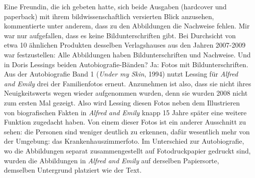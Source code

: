 \documentclass[fontsize=12pt]{scrartcl}
\begin{document}
Eine Freundin\textsuperscript{\tiny *}, die ich gebeten hatte, sich beide Ausgaben (hardcover und paperback) mit ihrem bildwissenschaftlich versierten Blick anzusehen, kommentierte unter anderem, dass zu den Abbildungen die Nachweise fehlen. Mir war nur aufgefallen, dass es keine Bildunterschriften gibt. Bei Durchsicht von etwa 10 \"ahnlichen Produkten desselben Verlagshauses aus den Jahren 2007-2009 war festzustellen: Alle Abbildungen haben Bildunterschriften und Nachweise. Und in Doris Lessings beiden Autobiografie-B\"anden? Ja: Fotos mit Bildunterschriften. Aus der Autobiografie Band 1 (\textit{Under my Skin}, 1994) nutzt Lessing f\"ur \textit{Alfred and Emily} drei der Familienfotos erneut. Anzunehmen ist also, dass sie nicht ihres Neuigkeitswerts wegen wieder aufgenommen wurden, denn sie wurden 2008 nicht zum ersten Mal gezeigt. Also wird Lessing diesen Fotos neben dem Illustrieren von biografischen Fakten in \textit{Alfred and Emily} knapp 15 Jahre sp\"ater eine weitere Funktion zugedacht haben. Von einem dieser Fotos ist ein an\-de\-rer Ausschnitt zu sehen: die Per\-so\-nen sind weniger deutlich zu erkennen, daf\"ur we\-sent\-lich mehr von der Umgebung: das Krankenhauszimmerfoto. Im Unterschied zur Autobiografie, wo die Abbildungen separat zusammengestellt auf Fotodruckpapier gedruckt sind, wurden die Abbildungen in \textit{Alfred and Emily} auf derselben Papiersorte, demselben Untergrund platziert wie der Text. 
\end{document}
